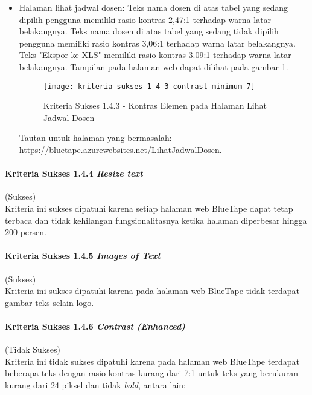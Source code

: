 \begin{itemize}
    \item Halaman lihat jadwal dosen: Teks nama dosen di atas tabel yang sedang dipilih pengguna memiliki rasio kontras 2,47:1 terhadap warna latar belakangnya. Teks nama dosen di atas tabel yang sedang tidak dipilih pengguna memiliki rasio kontras 3,06:1 terhadap warna latar belakangnya. Teks "Ekspor ke XLS" memiliki rasio kontras 3.09:1 terhadap warna latar belakangnya. Tampilan pada halaman web dapat dilihat pada gambar \ref{fig:1.4.3_contrast_minimum_7}.
    \begin{figure}[H]
        \centering  
        \texttt{[image: kriteria-sukses-1-4-3-contrast-minimum-7]}  
        \caption[Kriteria Sukses 1.4.3 - Kontras Elemen pada Halaman Lihat Jadwal Dosen]{Kriteria Sukses 1.4.3 - Kontras Elemen pada Halaman Lihat Jadwal Dosen}
        \label{fig:1.4.3_contrast_minimum_7}  
    \end{figure} 
    Tautan untuk halaman yang bermasalah: \url{https://bluetape.azurewebsites.net/LihatJadwalDosen}.
\end{itemize}

\paragraph{Kriteria Sukses 1.4.4 \textit{Resize text}}
\label{par:kepatuhan_bluetape_kriteria_sukses_1.4.4}
(Sukses)\\

Kriteria ini sukses dipatuhi karena setiap halaman web BlueTape dapat tetap terbaca dan tidak kehilangan fungsionalitasnya ketika halaman diperbesar hingga 200 persen. 

\paragraph{Kriteria Sukses 1.4.5 \textit{Images of Text}}
\label{par:kepatuhan_bluetape_kriteria_sukses_1.4.5}
(Sukses)\\

Kriteria ini sukses dipatuhi karena pada halaman web BlueTape tidak terdapat gambar teks selain logo.

\paragraph{Kriteria Sukses 1.4.6 \textit{Contrast (Enhanced)}}
\label{par:kepatuhan_bluetape_kriteria_sukses_1.4.6}
(Tidak Sukses)\\

Kriteria ini tidak sukses dipatuhi karena pada halaman web BlueTape terdapat beberapa teks dengan rasio kontras kurang dari 7:1 untuk teks yang berukuran kurang dari 24 piksel dan tidak \textit{bold}, antara lain:

